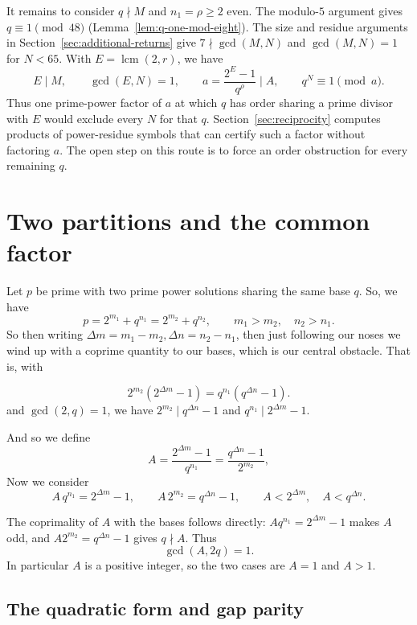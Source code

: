\documentclass[11pt]{article}
\begin{document}
It remains to consider $q\nmid M$ and $n_1=\rho\ge2$ even.
The modulo-$5$ argument gives $q\equiv1\pmod{48}$
(Lemma~\ref{lem:q-one-mod-eight}). The size and residue arguments
in Section~\ref{sec:additional-returns} give $7\nmid\gcd(M,N)$ and $\gcd(M,N)=1$ for $N<65$.
With $E=\operatorname{lcm}(2,r)$, we have
\[
E\mid M,\qquad \gcd(E,N)=1,\qquad
a=\frac{2^E-1}{q^\rho}\mid A,\qquad q^N\equiv1\pmod a.
\]
Thus one prime-power factor of $a$ at which $q$ has order sharing
a prime divisor with $E$ would exclude every $N$ for that $q$.
Section~\ref{sec:reciprocity} computes products of power-residue
symbols that can certify such a factor without factoring $a$.
The open step on this route is to force an order obstruction for every
remaining $q$.

\clearpage
{\small\tableofcontents}
\clearpage
\section{Two partitions and the common factor}
\label{sec:setup}

Let $p$ be prime with two prime power solutions sharing the same base $q$. So, we have
\[
p = 2^{m_1} + q^{n_1} = 2^{m_2} + q^{n_2}, \qquad m_1 > m_2, \quad n_2 > n_1.
\]
So then writing $\Delta m = m_1 - m_2, \Delta n = n_2 - n_1$, then just following our noses we
wind up with a coprime quantity to our bases, which is our central obstacle. That is, with

\[
2^{m_2}\left(2^{\Delta m} - 1\right) = q^{n_1}\left(q^{\Delta n} - 1\right).
\]
and  $\gcd(2,q) = 1$, we have $2^{m_2} \mid q^{\Delta n} - 1$ and $q^{n_1} \mid 2^{\Delta m} - 1$.

And so we define
\[
A = \frac{2^{\Delta m} - 1}{q^{n_1}} = \frac{q^{\Delta n} - 1}{2^{m_2}},
\]
Now we consider
\[
A\,q^{n_1} = 2^{\Delta m} - 1, \qquad A\,2^{m_2} = q^{\Delta n} - 1, \qquad A < 2^{\Delta m}, \quad A < q^{\Delta n}.
\]

The coprimality of $A$ with the bases follows directly:
$Aq^{n_1}=2^{\Delta m}-1$ makes $A$ odd, and
$A2^{m_2}=q^{\Delta n}-1$ gives $q\nmid A$. Thus
\[
\gcd(A,2q)=1.
\]
In particular $A$ is a positive integer, so the two cases are $A=1$ and
$A>1$.

\subsection{The quadratic form and gap parity}
\end{document}
